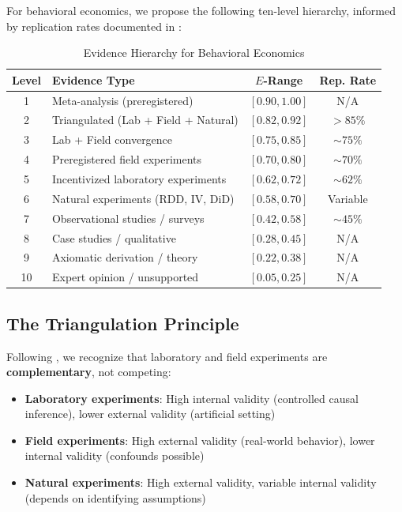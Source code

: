 \documentclass[11pt,a4paper]{article}
\begin{document}
For behavioral economics, we propose the following ten-level hierarchy, informed by replication rates documented in \citet{Camerer2016, Camerer2018}:

\begin{table}[h]
\centering
\caption{Evidence Hierarchy for Behavioral Economics}
\label{tab:E-scale}
\begin{tabular}{clcc}
\toprule
\textbf{Level} & \textbf{Evidence Type} & \textbf{$E$-Range} & \textbf{Rep. Rate} \\
\midrule
1 & Meta-analysis (preregistered) & $[0.90, 1.00]$ & N/A \\
2 & Triangulated (Lab + Field + Natural) & $[0.82, 0.92]$ & $>85\%$ \\
3 & Lab + Field convergence & $[0.75, 0.85]$ & $\sim 75\%$ \\
4 & Preregistered field experiments & $[0.70, 0.80]$ & $\sim 70\%$ \\
5 & Incentivized laboratory experiments & $[0.62, 0.72]$ & $\sim 62\%$ \\
6 & Natural experiments (RDD, IV, DiD) & $[0.58, 0.70]$ & Variable \\
7 & Observational studies / surveys & $[0.42, 0.58]$ & $\sim 45\%$ \\
8 & Case studies / qualitative & $[0.28, 0.45]$ & N/A \\
9 & Axiomatic derivation / theory & $[0.22, 0.38]$ & N/A \\
10 & Expert opinion / unsupported & $[0.05, 0.25]$ & N/A \\
\bottomrule
\end{tabular}
\end{table}

\subsection{The Triangulation Principle}

Following \citet{FalkHeckman2009}, we recognize that laboratory and field experiments are \textbf{complementary}, not competing:

\begin{itemize}
    \item \textbf{Laboratory experiments}: High internal validity (controlled causal inference), lower external validity (artificial setting)
    \item \textbf{Field experiments}: High external validity (real-world behavior), lower internal validity (confounds possible)
    \item \textbf{Natural experiments}: High external validity, variable internal validity (depends on identifying assumptions)
\end{itemize}
\end{document}
